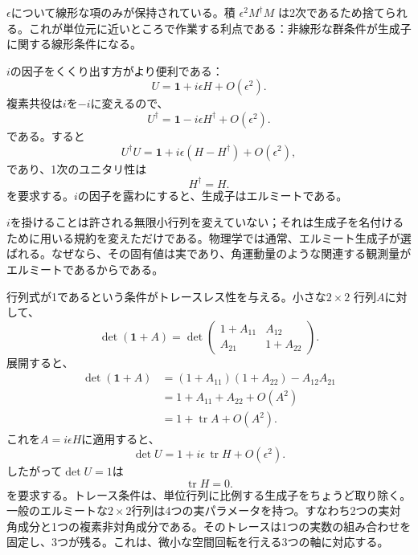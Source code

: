 \(\epsilon\)について線形な項のみが保持されている。積
\(\epsilon^2M^\dagger M\)
は2次であるため捨てられる。これが単位元に近いところで作業する利点である：非線形な群条件が生成子に関する線形条件になる。

\(i\)の因子をくくり出す方がより便利である：
\begin{equation}
U=\boldsymbol 1+i\epsilon H+O(\epsilon^2).
\label{eq:l3-small-u-herm}
\end{equation}
複素共役は\(i\)を\(-i\)に変えるので、
\begin{equation}
U^\dagger=\boldsymbol 1-i\epsilon H^\dagger+O(\epsilon^2).
\end{equation}
である。すると
\begin{equation}
U^\dagger U
=\boldsymbol 1+i\epsilon(H-H^\dagger)+O(\epsilon^2),
\end{equation}
であり、1次のユニタリ性は
\begin{equation}
H^\dagger=H.
\end{equation}
を要求する。\(i\)の因子を露わにすると、生成子はエルミートである。

\(i\)を掛けることは許される無限小行列を変えていない；それは生成子を名付けるために用いる規約を変えただけである。物理学では通常、エルミート生成子が選ばれる。なぜなら、その固有値は実であり、角運動量のような関連する観測量がエルミートであるからである。

行列式が1であるという条件がトレースレス性を与える。小さな\(2\times2\)
行列\(A\)に対して、
\begin{equation}
\det(\boldsymbol 1+A)
=
\det
\begin{pmatrix}
1+A_{11}&A_{12}\\
A_{21}&1+A_{22}
\end{pmatrix}.
\end{equation}
展開すると、
\begin{align}
\det(\boldsymbol 1+A)
 &=(1+A_{11})(1+A_{22})-A_{12}A_{21}\\
 &=1+A_{11}+A_{22}+O(A^2)\\
 &=1+\operatorname{tr}A+O(A^2).
\end{align}
これを\(A=i\epsilon H\)に適用すると、
\begin{equation}
\det U=1+i\epsilon\,\operatorname{tr}H+O(\epsilon^2).
\end{equation}
したがって\(\det U=1\)は
\begin{equation}
\operatorname{tr}H=0.
\end{equation}
を要求する。トレース条件は、単位行列に比例する生成子をちょうど取り除く。一般のエルミートな\(2\times2\)行列は4つの実パラメータを持つ。すなわち2つの実対角成分と1つの複素非対角成分である。そのトレースは1つの実数の組み合わせを固定し、3つが残る。これは、微小な空間回転を行える3つの軸に対応する。

